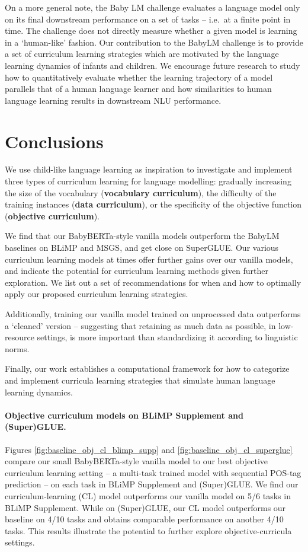 On a more general note, the Baby LM challenge evaluates a language model only on its final downstream performance on a set of tasks -- i.e.\ at a finite point in time. The challenge does not directly measure whether a given model is learning in a `human-like' fashion. Our contribution to the BabyLM challenge is to provide a set of curriculum learning strategies which are motivated by the language learning dynamics of infants and children. We encourage future research to study how to quantitatively evaluate whether the learning trajectory of a model parallels that of a human language learner and how similarities to human language learning results in downstream NLU performance. 

\section{Conclusions}
We use child-like language learning as inspiration to investigate and implement three types of curriculum learning for language modelling: gradually increasing the size of the vocabulary (\textbf{vocabulary curriculum}), the difficulty of the training instances (\textbf{data curriculum}), or the specificity of the objective function (\textbf{objective curriculum}).

We find that our BabyBERTa-style vanilla models outperform the BabyLM baselines on BLiMP and MSGS, and get close on SuperGLUE. Our various curriculum learning models at times offer further gains over our vanilla models, and indicate the potential for curriculum learning methods given further exploration. We list out a set of recommendations for when and how to optimally apply our proposed curriculum learning strategies.

Additionally, training our vanilla model trained on unprocessed data outperforms a `cleaned' version -- suggesting that retaining as much data as possible, in low-resource settings, is more important than standardizing it according to linguistic norms.

Finally, our work establishes a computational framework for how to categorize and implement curricula learning strategies that simulate human language learning dynamics. 

\paragraph{Objective curriculum models on BLiMP Supplement and (Super)GLUE.} Figures \ref{fig:baseline_obj_cl_blimp_supp} and \ref{fig:baseline_obj_cl_superglue} compare our small BabyBERTa-style vanilla  model to our best objective curriculum learning setting -- a multi-task trained model with sequential POS-tag prediction -- on each task in BLiMP Supplement and (Super)GLUE. We find our curriculum-learning (CL) model outperforms our vanilla model on 5/6 tasks in BLiMP Supplement. While on (Super)GLUE, our CL model outperforms our baseline on 4/10 tasks and obtains comparable performance on another 4/10 tasks. This results illustrate the potential to further explore objective-curricula settings.

